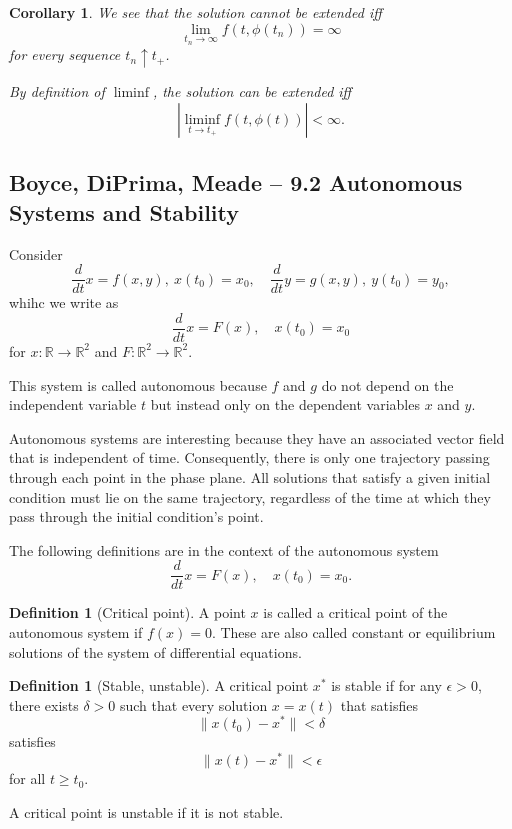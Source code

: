 \documentclass{tufte-handout}
\newcommand*\R{\mathbb{R}}
\newtheorem{cor}[thm]{Corollary}
\theoremstyle{definition}
\newtheorem{defn}[thm]{Definition}
\begin{document}
\begin{cor}
	We see that the solution cannot be extended iff \[
		\lim_{t_n \to \infty} f(t,\phi(t_n)) = \infty
	\] for every sequence $t_n \uparrow t_{+}$.

	By definition of $\liminf$, the solution can be extended iff \[
		\left|  \liminf_{t \to t_+} f(t,\phi(t))\right| < \infty
	.\] 
\end{cor}

\subsection{Boyce, DiPrima, Meade -- 9.2 Autonomous Systems and Stability}

Consider \[
	\frac{d}{dt}x = f(x,y),\ x(t_0) = x_0, \quad \frac{d}{dt}y = g(x,y),\ y(t_0) = y_0
,\] whihc we write as \[
	\frac{d}{dt}x = F(x), \quad x(t_0) = x_0
\] for $x: \R \to \R^2$ and $F: \R^2 \to \R^2$.

This system is called autonomous because $f$ and $g$ do not depend on the independent variable $t$ but instead only on the dependent variables $x$ and $y$.

Autonomous systems are interesting because they have an associated vector field that is independent of time. Consequently, there is only one trajectory passing through each point in the phase plane. All solutions that satisfy a given initial condition must lie on the same trajectory, regardless of the time at which they pass through the initial condition's point.

The following definitions are in the context of the autonomous system \[
	\frac{d}{dt}x = F(x), \quad x(t_0) = x_0
.\] 

\begin{defn}[Critical point]
	A point $x$ is called a critical point of the autonomous system if $f(x) = 0$. These are also called constant or equilibrium solutions of the system of differential equations.
\end{defn}

\begin{defn}[Stable, unstable]
	A critical point $x^*$ is stable if for any $\epsilon > 0$, there exists $\delta> 0$ such that every solution $x=x(t)$ that satisfies \[
		\|x(t_0) - x^*\| < \delta
	\] satisfies \[
		\|x(t) - x^*\| < \epsilon
	\] for all $t \ge t_0$.

	A critical point is unstable if it is not stable.
\end{defn}
\end{document}

